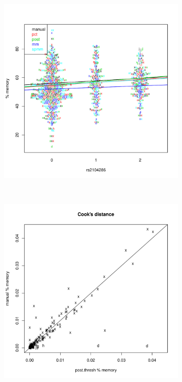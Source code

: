 \begin{figure}[h]
\centering
\begin{subfigure}[b]{.5\textwidth}
    \centering
    \includegraphics[scale=.5]{figures/rs2104286-ratio.pdf}
    \caption{}
\end{subfigure}
~
\begin{subfigure}[b]{.5\textwidth}
    \centering
    \includegraphics[scale=.5]{figures/rs2104286-ratio-cooks-distance.pdf}

\end{subfigure}
\end{figure}
